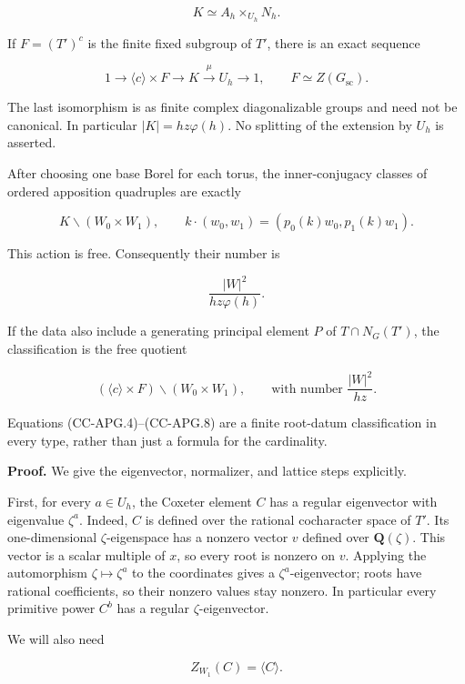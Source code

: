 \documentclass[11pt,a4paper]{article}
\theoremstyle{definition}\newtheorem{definition}[theorem]{Definition}
\theoremstyle{remark}\newtheorem{remark}[theorem]{Remark}
\begin{document}
\[
 K \simeq A_h\times_{U_h}N_h.
 \tag{CC-APG.6}
\]

If \(F=(T')^c\) is the finite fixed subgroup of \(T'\), there is an
exact sequence

\[
 1\longrightarrow \langle c\rangle\times F
 \longrightarrow K\xrightarrow{\ \mu\ }U_h
 \longrightarrow1,
 \qquad F\simeq Z(G_{\mathrm{sc}}).
 \tag{CC-APG.7}
\]

The last isomorphism is as finite complex diagonalizable groups and need
not be canonical. In particular \(|K|=hz\varphi(h)\). No splitting of
the extension by \(U_h\) is asserted.

After choosing one base Borel for each torus, the inner-conjugacy
classes of ordered apposition quadruples are exactly

\[
 K\backslash(W_0\times W_1),
 \qquad
 k\cdot(w_0,w_1)=(p_0(k)w_0,p_1(k)w_1).
 \tag{CC-APG.8}
\]

This action is free. Consequently their number is

\[
 \frac{|W|^2}{hz\varphi(h)}.
 \tag{CC-APG.9}
\]

If the data also include a generating principal element \(P\) of
\(T\cap N_G(T')\), the classification is the free quotient

\[
 (\langle c\rangle\times F)\backslash(W_0\times W_1),
 \qquad\text{with number }\frac{|W|^2}{hz}.
 \tag{CC-APG.10}
\]

Equations (CC-APG.4)--(CC-APG.8) are a finite root-datum classification
in every type, rather than just a formula for the cardinality.

\textbf{Proof.} We give the eigenvector, normalizer, and lattice steps
explicitly.

First, for every \(a\in U_h\), the Coxeter element \(C\) has a regular
eigenvector with eigenvalue \(\zeta^a\). Indeed, \(C\) is defined over
the rational cocharacter space of \(T'\). Its one-dimensional
\(\zeta\)-eigenspace has a nonzero vector \(v\) defined over
\(\mathbf Q(\zeta)\). This vector is a scalar multiple of \(x\), so
every root is nonzero on \(v\). Applying the automorphism
\(\zeta\mapsto\zeta^a\) to the coordinates gives a
\(\zeta^a\)-eigenvector; roots have rational coefficients, so their
nonzero values stay nonzero. In particular every primitive power \(C^b\)
has a regular \(\zeta\)-eigenvector.

We will also need

\[
 Z_{W_1}(C)=\langle C\rangle.
 \tag{CC-APG.11}
\]
\end{document}
